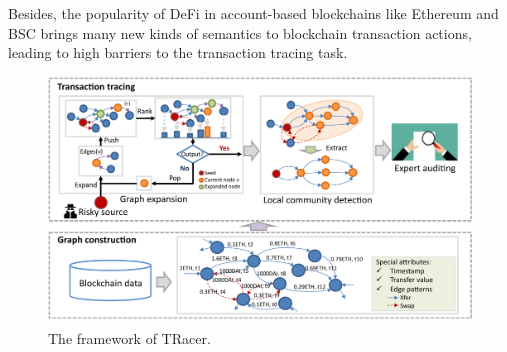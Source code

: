 Besides, the popularity of DeFi in account-based blockchains like Ethereum and BSC brings many new kinds of semantics to blockchain transaction actions, leading to high barriers to the transaction tracing task.

\begin{figure}[t]
    \centering
    \includegraphics[width=0.65\linewidth]{figures/framework.pdf}
    \caption{The framework of TRacer.}
    \label{fig:TRacer}
\end{figure}

